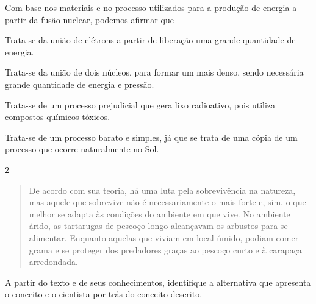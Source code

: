 Com base nos materiais e no processo utilizados para a produção de
energia a partir da fusão nuclear, podemos afirmar que

\begin{escolha}
\item
  Trata-se da união de elétrons a partir de liberação uma grande quantidade de energia.
\item
  Trata-se da união de dois núcleos, para formar um mais denso, sendo
  necessária grande quantidade de energia e pressão.
\item
  Trata-se de um processo prejudicial que gera lixo radioativo, pois
  utiliza compostos químicos tóxicos.
\item
  Trata-se de um processo barato e simples, já que se trata de uma cópia
  de um processo que ocorre naturalmente no Sol.
\end{escolha}


\num{2}
\begin{quote}
  De acordo com sua teoria, há uma luta pela sobrevivência na
  natureza, mas aquele que sobrevive não é necessariamente o mais forte
  e, sim, o que melhor se adapta às condições do ambiente em que vive.
  No ambiente árido, as tartarugas de pescoço longo alcançavam os
  arbustos para se alimentar. Enquanto aquelas que viviam em local
  úmido, podiam comer grama e se proteger dos predadores graças ao
  pescoço curto e à carapaça arredondada.

\end{quote}

A partir do texto e de seus conhecimentos, identifique a alternativa que
apresenta o conceito e o cientista por trás do conceito descrito.

